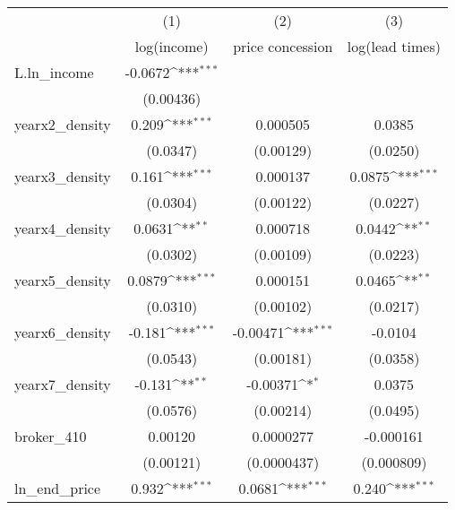 {
\def\sym#1{\ifmmode^{#1}\else\(^{#1}\)\fi}
\begin{tabular}{l*{3}{c}}
\toprule
            &\multicolumn{1}{c}{(1)}&\multicolumn{1}{c}{(2)}&\multicolumn{1}{c}{(3)}\\
            &\multicolumn{1}{c}{log(income)}&\multicolumn{1}{c}{price concession}&\multicolumn{1}{c}{log(lead times)}\\
\midrule
L.ln\_income &     -0.0672\sym{***}&                     &                     \\
            &   (0.00436)         &                     &                     \\
\addlinespace
yearx2\_density&       0.209\sym{***}&    0.000505         &      0.0385         \\
            &    (0.0347)         &   (0.00129)         &    (0.0250)         \\
\addlinespace
yearx3\_density&       0.161\sym{***}&    0.000137         &      0.0875\sym{***}\\
            &    (0.0304)         &   (0.00122)         &    (0.0227)         \\
\addlinespace
yearx4\_density&      0.0631\sym{**} &    0.000718         &      0.0442\sym{**} \\
            &    (0.0302)         &   (0.00109)         &    (0.0223)         \\
\addlinespace
yearx5\_density&      0.0879\sym{***}&    0.000151         &      0.0465\sym{**} \\
            &    (0.0310)         &   (0.00102)         &    (0.0217)         \\
\addlinespace
yearx6\_density&      -0.181\sym{***}&    -0.00471\sym{***}&     -0.0104         \\
            &    (0.0543)         &   (0.00181)         &    (0.0358)         \\
\addlinespace
yearx7\_density&      -0.131\sym{**} &    -0.00371\sym{*}  &      0.0375         \\
            &    (0.0576)         &   (0.00214)         &    (0.0495)         \\
\addlinespace
broker\_410  &     0.00120         &   0.0000277         &   -0.000161         \\
            &   (0.00121)         & (0.0000437)         &  (0.000809)         \\
\addlinespace
ln\_end\_price&       0.932\sym{***}&      0.0681\sym{***}&       0.240\sym{***}\\

\end{tabular}}

